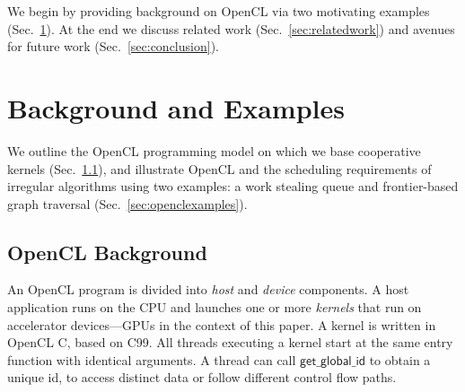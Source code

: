 \documentclass[sigconf]{acmart}
\makeatletter
\renewcommand\paragraph{\@startsection{paragraph}{4}{\z@}%
  {-.5\baselineskip \@plus -2\p@ \@minus -.2\p@}%
  {-3.5\p@}%
  {\bfseries\@parfont}}
\newcommand{\mysec}{Sec.~}
\newcommand{\getglobalid}{\mathsf{get\_global\_id}}
\makeatother
\begin{document}
We begin by providing background on OpenCL via two motivating examples (\mysec\ref{sec:background}).  At the end we discuss related work (\mysec\ref{sec:relatedwork}) and avenues for future work (\mysec\ref{sec:conclusion}).

\section{Background and Examples}\label{sec:background}

We outline the OpenCL programming model on which we
base cooperative kernels (\mysec\ref{sec:opencl}), and illustrate
OpenCL and the scheduling requirements of irregular algorithms using two examples: a work stealing queue and frontier-based graph traversal
(\mysec\ref{sec:openclexamples}).

\subsection{OpenCL Background}\label{sec:opencl}



An OpenCL program is divided into \emph{host} and \emph{device}
components.  A host application runs on the CPU and launches one or
more \emph{kernels} that run on accelerator devices---GPUs in the
context of this paper.  A kernel is written in OpenCL C, based on C99.
All threads executing a kernel start at the same entry function with
identical arguments.  A thread can call $\getglobalid$
to obtain a unique id, to access distinct data or follow different control flow paths.
\end{document}
